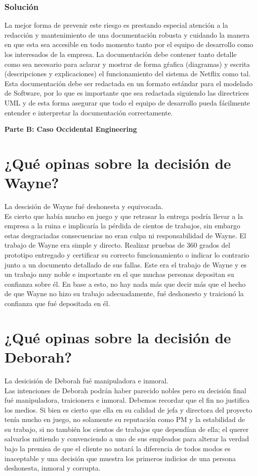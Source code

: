 \documentclass{article}
\newcommand*\rbreak{\par\noindent\linebreak}
\begin{document}
\subsubsection{Solución}
La mejor forma de prevenir este riesgo es prestando especial 
atención a la redacción y mantenimiento de una documentación robusta
y cuidando la manera en que esta sea accesible en todo momento
tanto por el equipo de desarrollo como los interesados de la 
empresa. La documentación debe contener tanto detalle como sea 
necesario para aclarar y mostrar de forma gŕafica (diagramas) y 
escrita (descripciones y explicaciones) el funcionamiento del sistema
de Netflix como tal. Esta documentación debe ser redactada en un 
formato estándar para el modelado de Software, por lo que es
importante que sea redactada siguiendo las directrices UML y de esta
forma asegurar que todo el equipo de desarrollo pueda fácilmente 
entender e interpretar la documentación correctamente.

\clearpage\textbf{\huge{Parte B: Caso Occidental Engineering}}\rbreak
\section{¿Qué opinas sobre la decisión de Wayne?}
La descisión de Wayne fué deshonesta y equivocada. \\
Es cierto que había
mucho en juego y que retrasar la entrega podría llevar a la empresa
a la ruina e implicaría la pérdida de cientos de trabajos, sin 
embargo estas desgraciadas consecuencias no eran culpa ni 
responsabilidad de Wayne. El trabajo de Wayne era simple
y directo. Realizar pruebas de 360 grados del prototipo entregado y
certificar su correcto funcionamiento o indicar lo contrario junto a
un documento detallado de sus fallas. Este era el trabajo de Wayne
y es un trabajo muy noble e importante en el que muchas personas
depositan su confianza sobre él. En base a esto, no hay nada más 
que decir más que el hecho de que Wayne no hizo su trabajo 
adecuadamente, fué deshonesto y traicionó la confianza que
fué depositada en él.
\section{¿Qué opinas sobre la decisión de Deborah?}
La desicisión de Deborah fué manipuladora e inmoral. \\
Las intenciones de Deborah podrán haber parecido nobles pero 
su decisión final fué manipuladora, traicionera e inmoral. 
Debemos recordar que el fin no justifica los medios. Si bien
es cierto que ella en su calidad de jefa y directora del proyecto
tenía mucho en juego, no solamente su reputación como PM y la
estabilidad de su trabajo, si no también los cientos de trabajos
que dependían de ella; el querer salvarlos mitiendo y convenciendo
a uno de sus empleados para alterar la verdad bajo la premisa de 
que el cliente no notará la diferencia de todos modos es inaceptable
y una decisión que muestra los primeros indicios de una persona
deshonesta, inmoral y corrupta.
\end{document}
